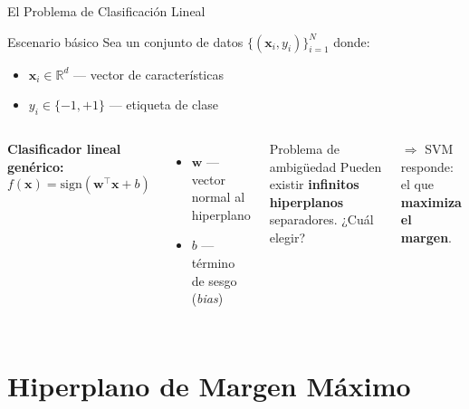 \documentclass[aspectratio=169,xcolor=dvipsnames]{beamer}
\begin{document}
\begin{frame}{El Problema de Clasificación Lineal}
    \begin{block}{Escenario básico}
        Sea un conjunto de datos $\{(\mathbf{x}_i, y_i)\}_{i=1}^{N}$ donde:
        \begin{itemize}
            \item $\mathbf{x}_i \in \mathbb{R}^d$ — vector de características
            \item $y_i \in \{-1, +1\}$ — etiqueta de clase
        \end{itemize}
    \end{block}

    \vspace{0.4em}

    \begin{columns}
        \textbf{Clasificador lineal genérico:}
        \begin{equation}
            f(\mathbf{x}) = \text{sign}(\mathbf{w}^\top \mathbf{x} + b)
        \end{equation}
        \begin{itemize}
            \item $\mathbf{w}$ — vector normal al hiperplano
            \item $b$ — término de sesgo (\textit{bias})
        \end{itemize}

        \begin{alertblock}{Problema de ambigüedad}
            Pueden existir \textbf{infinitos hiperplanos} separadores. ¿Cuál elegir?
        \end{alertblock}
        \vspace{0.3em}
        $\Rightarrow$ SVM responde: el que \textbf{maximiza el margen}.
    \end{columns}
\end{frame}

\section{Hiperplano de Margen Máximo}
\end{document}
